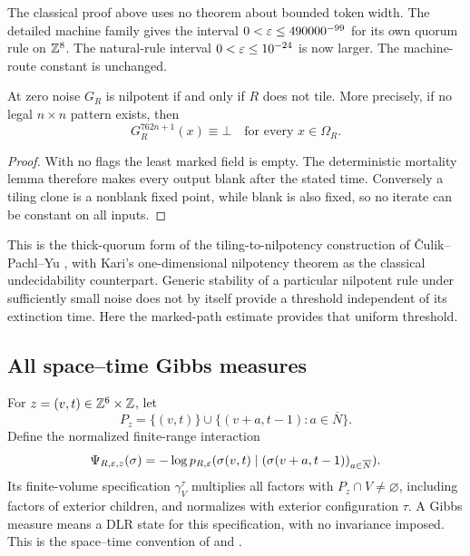 The classical proof above uses no theorem about bounded token width. The detailed machine family gives the interval $0<\varepsilon\le490000^{-99}$ for its own quorum rule on $\mathbb{Z}^8$. The natural-rule interval $0<\varepsilon\le10^{-24}$ is now larger. The machine-route constant is unchanged.

\begin{corollary}[Nilpotency]\label{nw:nilpotent}
At zero noise $G_R$ is nilpotent if and only if $R$ does not tile. More precisely, if no legal $n\times n$ pattern exists, then
\[
 G_R^{762n+1}(x)\equiv\bot\quad\text{for every }x\in\Omega_R.
\]
\end{corollary}
\begin{proof}
With no flags the least marked field is empty. The deterministic mortality lemma therefore makes every output blank after the stated time. Conversely a tiling clone is a nonblank fixed point, while blank is also fixed, so no iterate can be constant on all inputs.
\end{proof}

This is the thick-quorum form of the tiling-to-nilpotency construction of \v{C}ulik--Pachl--Yu \cite{CPY89}, with Kari's one-dimensional nilpotency theorem \cite{Kari92} as the classical undecidability counterpart. Generic stability of a particular nilpotent rule under sufficiently small noise \cite{MST19} does not by itself provide a threshold independent of its extinction time. Here the marked-path estimate provides that uniform threshold.

\subsection{All space--time Gibbs measures}

For $z=(v,t)\in\mathbb{Z}^6\times\mathbb{Z}$, let
\[
 P_z=\{(v,t)\}\cup\{(v+a,t-1):a\in\overline N\}.
\]
Define the normalized finite-range interaction
\begin{equation}\label{nw:interaction}
 \Psi_{R,\varepsilon,z}(\sigma)
 =-\log p_{R,\varepsilon}(\sigma(v,t)\mid
                 (\sigma(v+a,t-1))_{a\in\overline N}).
\end{equation}
Its finite-volume specification $\gamma_V^\tau$ multiplies all factors with $P_z\cap V\ne\varnothing$, including factors of exterior children, and normalizes with exterior configuration $\tau$. A Gibbs measure means a DLR state for this specification, with no invariance imposed. This is the space--time convention of \cite[Section~2]{DM26} and \cite{GKLM89}.

